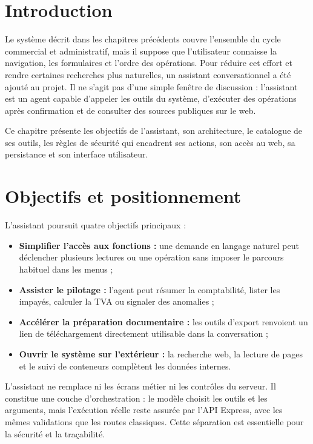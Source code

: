 \documentclass[12pt,a4paper,oneside]{report}
\begin{document}
\section*{Introduction}
Le système décrit dans les chapitres précédents couvre l'ensemble du cycle commercial et administratif, mais il suppose que l'utilisateur connaisse la navigation, les formulaires et l'ordre des opérations. Pour réduire cet effort et rendre certaines recherches plus naturelles, un assistant conversationnel a été ajouté au projet. Il ne s'agit pas d'une simple fenêtre de discussion : l'assistant est un agent capable d'appeler les outils du système, d'exécuter des opérations après confirmation et de consulter des sources publiques sur le web.

Ce chapitre présente les objectifs de l'assistant, son architecture, le catalogue de ses outils, les règles de sécurité qui encadrent ses actions, son accès au web, sa persistance et son interface utilisateur.

\section{Objectifs et positionnement}
L'assistant poursuit quatre objectifs principaux :
\begin{itemize}
  \item \textbf{Simplifier l'accès aux fonctions :} une demande en langage naturel peut déclencher plusieurs lectures ou une opération sans imposer le parcours habituel dans les menus ;
  \item \textbf{Assister le pilotage :} l'agent peut résumer la comptabilité, lister les impayés, calculer la TVA ou signaler des anomalies ;
  \item \textbf{Accélérer la préparation documentaire :} les outils d'export renvoient un lien de téléchargement directement utilisable dans la conversation ;
  \item \textbf{Ouvrir le système sur l'extérieur :} la recherche web, la lecture de pages et le suivi de conteneurs complètent les données internes.
\end{itemize}

L'assistant ne remplace ni les écrans métier ni les contrôles du serveur. Il constitue une couche d'orchestration : le modèle choisit les outils et les arguments, mais l'exécution réelle reste assurée par l'API Express, avec les mêmes validations que les routes classiques. Cette séparation est essentielle pour la sécurité et la traçabilité.
\end{document}
